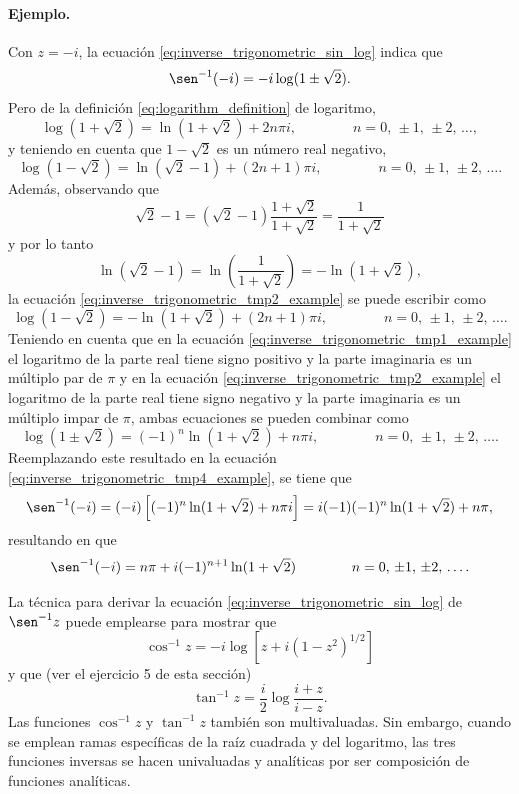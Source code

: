 \documentclass[a4paper]{report}
\begin{document}
\paragraph{Ejemplo.} Con \(z=-i\), la ecuación \ref{eq:inverse_trigonometric_sin_log} indica que 
\begin{equation}\label{eq:inverse_trigonometric_tmp4_example}
 \sen^{-1}(-i)=-i\log(1\pm\sqrt{2}).
\end{equation}
Pero de la definición \ref{eq:logarithm_definition} de logaritmo,
\begin{equation}\label{eq:inverse_trigonometric_tmp1_example}
 \log(1+\sqrt{2})=\ln(1+\sqrt{2})+2n\pi i,
 \qquad\qquad
 n=0,\,\pm1,\,\pm2,\,\dots,
\end{equation}
y teniendo en cuenta que \(1-\sqrt{2}\) es un número real negativo,
\begin{equation}\label{eq:inverse_trigonometric_tmp3_example}
 \log(1-\sqrt{2})=\ln(\sqrt{2}-1)+(2n+1)\pi i,
 \qquad\qquad
 n=0,\,\pm1,\,\pm2,\,\dots. 
\end{equation}
Además, observando que 
\[
 \sqrt{2}-1=(\sqrt{2}-1)\frac{1+\sqrt{2}}{1+\sqrt{2}}=\frac{1}{1+\sqrt{2}}
\]
y por lo tanto
\[
 \ln(\sqrt{2}-1)=\ln\left(\frac{1}{1+\sqrt{2}}\right)=-\ln(1+\sqrt{2}),
\]
la ecuación \ref{eq:inverse_trigonometric_tmp2_example} se puede escribir como
\begin{equation}\label{eq:inverse_trigonometric_tmp2_example}
 \log(1-\sqrt{2})=-\ln(1+\sqrt{2})+(2n+1)\pi i,
 \qquad\qquad
 n=0,\,\pm1,\,\pm2,\,\dots. 
\end{equation}
Teniendo en cuenta que en la ecuación \ref{eq:inverse_trigonometric_tmp1_example} el logaritmo de la parte real tiene signo positivo y la parte imaginaria es un múltiplo par de
\(\pi\) y en la ecuación \ref{eq:inverse_trigonometric_tmp2_example} el logaritmo de la parte real tiene signo negativo y la parte imaginaria es un múltiplo impar de
\(\pi\), ambas ecuaciones se pueden combinar como
\[
 \log(1\pm\sqrt{2})=(-1)^n\ln(1+\sqrt{2})+n\pi i,
 \qquad\qquad
 n=0,\,\pm1,\,\pm2,\,\dots.
\]
Reemplazando este resultado en la ecuación \ref{eq:inverse_trigonometric_tmp4_example}, se tiene que 
\[
 \sen^{-1}(-i)=(-i)\left[(-1)^n\ln(1+\sqrt{2})+n\pi i\right]=i(-1)(-1)^n\ln(1+\sqrt{2})+n\pi,
\]
resultando en que 
\[
 \sen^{-1}(-i)=n\pi+i(-1)^{n+1}\ln(1+\sqrt{2})
 \qquad\qquad
 n=0,\,\pm1,\,\pm2,\,\dots.
\]

La técnica para derivar la ecuación \ref{eq:inverse_trigonometric_sin_log} de \(\sen^{-1}z\) puede emplearse para mostrar que 
\begin{equation}\label{eq:inverse_trigonometric_cos_log}
 \cos^{-1}z=-i\log\left[z+i(1-z^2)^{1/2}\right]
\end{equation}
y que (ver el ejercicio 5 de esta sección)
\begin{equation}\label{eq:inverse_trigonometric_tan_log}
 \tan^{-1}z=\frac{i}{2}\log\frac{i+z}{i-z}. 
\end{equation}
Las funciones \(\cos^{-1}z\) y \(\tan^{-1}z\) también son multivaluadas. Sin embargo, cuando se emplean ramas específicas de la raíz cuadrada y del logaritmo, las tres funciones inversas se hacen univaluadas y analíticas por ser composición de funciones analíticas.
\end{document}
